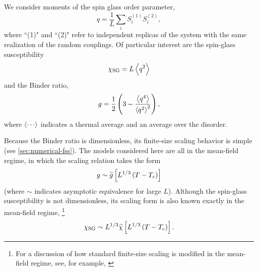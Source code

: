 \begin{table}
  \centering
  \caption[%
    Simulation parameters for 1-d long-range models with undiluted bonds.
  ]
  {%
    Simulation parameters for the undiluted models. $N_{\mathrm{samp}}$ is the
    number of samples; $N_{\mathrm{equil}}$ and $N_{\mathrm{meas}}$ are the
    numbers of sweeps used for the equilibration and measurement phases
    respectively. We simulate $N_T$ logarithmically-spaced temperatures between
    $T_{\mathrm{min}}$ and $T_{\mathrm{max}}$.
  }
  \label{tab:nonextensive-params-c}
\end{table}

\begin{table}
  \centering
  \caption[%
    Simulation parameters for 1-d long-range models with diluted bonds.
  ]
  {Simulation parameters for the diluted models.}
  \label{tab:nonextensive-params-d}
\end{table}


We consider moments of the spin glass order parameter,
\begin{equation}
  q = \frac{1}{L} \sum_i S_i^{(1)} S_i^{(2)},
\end{equation}
where ``(1)" and ``(2)" refer to independent replicas of the system with the
same realization of the random couplings. Of particular interest are the
spin-glass susceptibility
\begin{equation}
  \chi_{\mathrm{SG}} = L\left< q^2 \right>
  \label{eq:sgsusc}
\end{equation}
and the Binder ratio,
\begin{equation}
  g = \frac{1}{2}\left(3 - \frac{\left< q^4 \right>}{\left< q^2 \right>^2}\right),
  \label{eq:binder-ratio}
\end{equation}
where $\av{\cdots}$ indicates a thermal average and an average over the disorder.

Because the Binder ratio is dimensionless, its finite-size scaling behavior is
simple (see \cref{sec:numerical-fss}). The models considered here are all in
the mean-field regime, in which the scaling relation takes the form
\begin{equation}
  g \sim \widetilde{g}\left[L^{1/3} \left(T-T_c\right)\right]
  \label{eq:binder-scaling}
\end{equation}
(where $\sim$ indicates asymptotic equivalence for large $L$).
Although the spin-glass susceptibility is not dimensionless, its scaling form
is also known exactly in the mean-field regime,%
\footnote{%
  For a discussion of how standard finite-size scaling is modified in the
  mean-field regime, see, for example,
  \autocite{binder1985finite, luijten1999finite, jones2005finite,
    brezin1982investigation, brezin1985finite}
}
\begin{equation}
  \chi_{\mathrm{SG}} \sim L^{1/3} \widetilde{\chi}\left[L^{1/3} \left(T-T_c\right)\right].
  \label{eq:sgsusc-scaling}
\end{equation}

